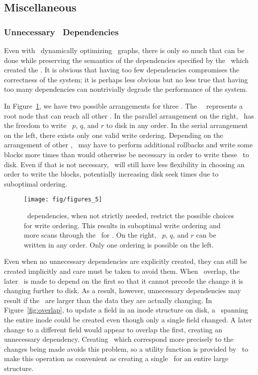 \subsection{Miscellaneous}
\label{sec:patch:misc}

\subsubsection{Unnecessary \ChDesc\ Dependencies}
Even with \Kudos\ dynamically optimizing \chdesc\ graphs, there is only so much
that can be done while preserving the semantics of the dependencies specified by
the \module\ which created the \chdescs. It is obvious that having too few
dependencies compromises the correctness of the system; it is perhaps less
obvious but no less true that having too many dependencies can nontrivially
degrade the performance of the system.

In Figure~\ref{fig:chdescarrange}, we have two possible arrangements for three
\chdescs. The \noop\ \chdesc\ represents a root node that can reach all
other \chdescs. In the parallel arrangement on the right, \Kudos\ has the
freedom to write \chdescs\ $p$, $q$, and $r$ to disk in any order. In the
serial arrangement on the left, there exists only one valid write ordering.
Depending on the arrangement of other \chdescs, \Kudos\ may have to perform
additional rollbacks and write some blocks more times than would otherwise be
necessary in order to write these \chdescs\ to disk. Even if that is not
necessary, \Kudos\ will still have less flexibility in choosing an order to
write the blocks, potentially increasing disk seek times due to suboptimal
ordering.

\begin{figure}[htb]
  \centering
  \texttt{[image: fig/figures\_5]}
  \caption{\label{fig:chdescarrange} \Chdesc\ dependencies, when
  not strictly needed, restrict the possible choices for write ordering.
  This results in suboptimal write ordering and more scans through the
  \chdescs\ for \Kudos. On the right, \chdescs\ $p$, $q$, and $r$ can be
  written in any order. Only one ordering is possible on the left.}
\end{figure}

Even when no unnecessary dependencies are explicitly created, they can still be
created implicitly and care must be taken to avoid them. When \chdescs\ overlap,
the later \chdesc\ is made to depend on the first so that it cannot precede the
change it is changing further to disk. As a result, however, unnecessary
dependencies may result if the \chdescs\ are larger than the data they are
actually changing. In Figure~\ref{fig:overlap}, to update a field in an inode
structure on disk, a \chdesc\ spanning the entire inode could be created even
though only a single field changed. A later change to a different field would
appear to overlap the first, creating an unnecessary dependency. Creating
\chdescs\ which correspond more precisely to the changes being made avoids this
problem, so a utility function is provided by \Kudos\ to make this operation as
convenient as creating a single \chdesc\ for an entire large structure.

